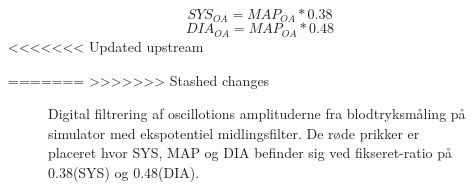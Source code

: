 	\begin{equation}
	SYS_{OA}=MAP_{OA}*0.38
	\label{eq:sysratio}
	\end{equation}
	\begin{equation}
	DIA_{OA}=MAP_{OA}*0.48
	\label{eq:diaratio}
	\end{equation}
<<<<<<< Updated upstream

=======
>>>>>>> Stashed changes

\begin{figure}[H]
	\centering
	\caption{Digital filtrering af oscillotions amplituderne fra blodtryksmåling på simulator med ekspotentiel midlingsfilter. De røde prikker er placeret  hvor SYS, MAP og DIA befinder sig ved fikseret-ratio på 0.38(SYS) og 0.48(DIA).}
\end{figure}
  